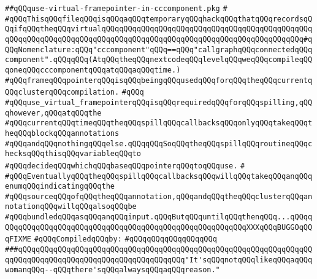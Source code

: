\label{src/lib/compiler/back/low/main/main/use-virtual-framepointer-in-cccomponent.pkg}
\verb|##qQQquse-virtual-framepointer-in-cccomponent.pkg|\newline
\verb|#|\newline
\verb|#qQQqThisqQQqfileqQQqisqQQqaqQQqtemporaryqQQqhackqQQqthatqQQqrecordsqQQqifqQQqtheqQQqvirtualqQQqqQQqqQQqqQQqqQQqqQQqqQQqqQQqqQQqqQQqqQQqqQQqqQQqqQQqqQQqqQQqqQQqqQQqqQQqqQQqqQQqqQQqqQQqqQQqqQQqqQQqqQQqqQQqqQQq#qQQqNomenclature:qQQq"cccomponent"qQQq==qQQq"callgraphqQQqconnectedqQQqcomponent".qQQqqQQq(AtqQQqtheqQQqnextcodeqQQqlevelqQQqweqQQqcompileqQQqoneqQQqcccomponentqQQqatqQQqaqQQqtime.)|\newline
\verb|#qQQqframeqQQqpointerqQQqisqQQqbeingqQQqusedqQQqforqQQqtheqQQqcurrentqQQqclusterqQQqcompilation.|\newline
\verb|#qQQq|\newline
\verb|#qQQquse_virtual_framepointerqQQqisqQQqrequiredqQQqforqQQqspilling,qQQqhowever,qQQqatqQQqthe|\newline
\verb|#qQQqcurrentqQQqtimeqQQqtheqQQqspillqQQqcallbacksqQQqonlyqQQqtakeqQQqtheqQQqblockqQQqannotations|\newline
\verb|#qQQqandqQQqnothingqQQqelse.qQQqqQQqSoqQQqtheqQQqspillqQQqroutineqQQqchecksqQQqthisqQQqvariableqQQqto|\newline
\verb|#qQQqdecideqQQqwhichqQQqbaseqQQqpointerqQQqtoqQQquse.|\newline
\verb|#|\newline
\verb|#qQQqEventuallyqQQqtheqQQqspillqQQqcallbacksqQQqwillqQQqtakeqQQqanqQQqenumqQQqindicatingqQQqthe|\newline
\verb|#qQQqsourceqQQqofqQQqtheqQQqannotation,qQQqandqQQqtheqQQqclusterqQQqannotationqQQqwillqQQqalsoqQQqbe|\newline
\verb|#qQQqbundledqQQqasqQQqanqQQqinput.qQQqButqQQquntilqQQqthenqQQq...qQQqqQQqqQQqqQQqqQQqqQQqqQQqqQQqqQQqqQQqqQQqqQQqqQQqqQQqqQQqXXXqQQqBUGGOqQQqFIXME|\newline
\newline
\verb|#qQQqCompiledqQQqby:|\newline
\verb|#qQQqqQQqqQQqqQQqqQQq|\newline
\newline
\newline
\newline
\verb|###qQQqqQQqqQQqqQQqqQQqqQQqqQQqqQQqqQQqqQQqqQQqqQQqqQQqqQQqqQQqqQQqqQQqqQQqqQQqqQQqqQQqqQQqqQQqqQQqqQQqqQQqqQQq"It'sqQQqnotqQQqlikeqQQqaqQQqwomanqQQq--qQQqthere'sqQQqalwaysqQQqaqQQqreason."|\newline
